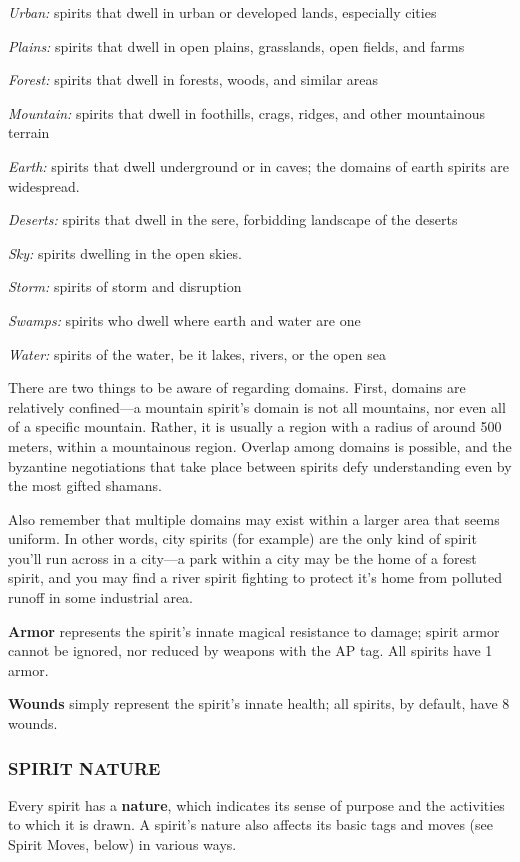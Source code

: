 \documentclass[oneside,10pt]{article}
\begin{document}
\begin{multicols}{2}
\begin{adjustwidth*}{.5cm}{.5cm}
\textit{Urban:} spirits that dwell in urban or developed lands, especially cities

\textit{Plains:} spirits that dwell in open plains, grasslands, open
fields, and farms

\textit{Forest:} spirits that dwell in forests, woods, and similar areas

\textit{Mountain:} spirits that dwell in foothills, crags, ridges, and
other mountainous terrain

\textit{Earth:} spirits that dwell underground or in caves; the domains of earth spirits are widespread.

\textit{Deserts:} spirits that dwell in the sere, forbidding landscape
of the deserts

\textit{Sky:} spirits dwelling in the open skies.

\textit{Storm:} spirits of storm and disruption

\textit{Swamps:} spirits who dwell where earth and water are one

\textit{Water:} spirits of the water, be it lakes, rivers, or the open
sea
\end{adjustwidth*}
There are two things to be aware of regarding domains. First,
domains are relatively confined—a mountain spirit’s domain
is not all mountains, nor even all of a specific mountain. Rather, it is usually a region with a radius of around 500 meters,
within a mountainous region. Overlap among domains is possible, and the byzantine negotiations that take place between
spirits defy understanding even by the most gifted shamans.

Also remember that multiple domains may exist within a
larger area that seems uniform. In other words, city spirits
(for example) are the only kind of spirit you’ll run across in a
city—a park within a city may be the home of a forest spirit,
and you may find a river spirit fighting to protect it’s home
from polluted runoff in some industrial area.

\textbf{Armor} represents the spirit’s innate magical resistance to
damage; spirit armor cannot be ignored, nor reduced by
weapons with the AP tag. All spirits have 1 armor.

\textbf{Wounds} simply represent the spirit’s innate health; all spirits,
by default, have 8 wounds.

\subsubsection{SPIRIT NATURE}
Every spirit has a \textbf{nature}, which indicates its sense of purpose
and the activities to which it is drawn. A spirit’s nature also
affects its basic tags and moves (see Spirit Moves, below) in
various ways.


\end{multicols}
\end{document}
